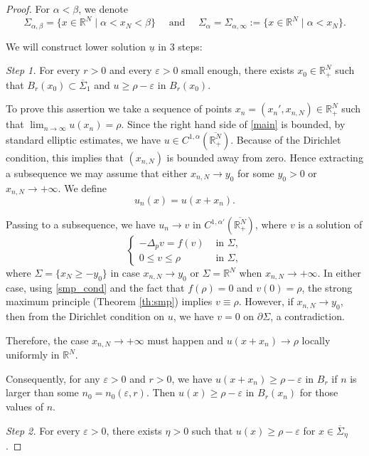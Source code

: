 \documentclass[10pt,a4paper]{amsart}
\begin{document}
	\begin{proof}
		For $\alpha<\beta$, we denote
		\[
		\Sigma_{\alpha,\beta} = \{x\in\mathbb{R}^N \mid \alpha < x_N < \beta\} \quad\text{ and }\quad \Sigma_\alpha = \Sigma_{\alpha,\infty} := \{x\in\mathbb{R}^N \mid \alpha < x_N \}.
		\]
		
		We will construct lower solution $\underline u$ in 3 steps:
		
		\textit{Step 1.} For every $r > 0$ and every $\varepsilon > 0$ small enough, there exists $x_0 \in \mathbb{R}^N_+$
		such that $B_r(x_0) \subset \overline\Sigma_1$ and $u \ge \rho - \varepsilon$ in $B_r(x_0)$.
		
		To prove this assertion we take a sequence of points $x_n=(x_n', x_{n,N}) \in \mathbb{R}^N_+$ such that $\lim_{n\to\infty} u(x_n) = \rho$. Since the right hand side of \eqref{main} is bounded, by standard elliptic estimates, we have $u\in C^{1,\alpha}(\overline{\mathbb{R}^N_+})$. Because of the Dirichlet condition, this implies that $(x_{n,N})$ is bounded away from zero. Hence extracting a subsequence we may assume that either $x_{n,N}\to y_0$ for some $y_0>0$ or $x_{n,N}\to+\infty$. We define
		\[
		u_n(x) = u(x+x_n).
		\]
		
		Passing to a subsequence, we have $u_n\to v$ in $C^{1,\alpha'}(\overline{\mathbb{R}^N_+})$, where $v$ is a solution of
		\[
		\begin{cases}
			-\Delta_p v = f(v) & \text{ in } \Sigma,\\
			0 \le v \le \rho & \text{ in } \Sigma,
		\end{cases}
		\]
		where $\Sigma=\{x_N \ge -y_0\}$ in case $x_{n,N}\to y_0$ or $\Sigma=\mathbb{R}^N$ when $x_{n,N}\to+\infty$. In either case, using \eqref{smp_cond} and the fact that $f (\rho) = 0$ and $v(0)=\rho$, the strong maximum principle (Theorem \ref{th:smp}) implies $v\equiv\rho$. However, if $x_{n,N}\to y_0$, then from the Dirichlet condition on $u$, we have $v=0$ on $\partial \Sigma$, a contradiction.
		
		Therefore, the case $x_{n,N}\to+\infty$ must happen and $u(x+x_n) \to \rho$ locally uniformly in $\mathbb{R}^N$.
		
		Consequently, for any $\varepsilon > 0$ and $r > 0$, we have $u(x + x_n) \ge \rho - \varepsilon$ in $B_r$ if $n$ is larger than some $n_0 = n_0(\varepsilon, r)$. Then $u(x) \ge \rho - \varepsilon$ in $B_r(x_n)$ for those values of $n$.
		
		\textit{Step 2.} For every $\varepsilon > 0$, there exists $\eta > 0$ such that $u(x) \ge \rho - \varepsilon$ for $x\in\overline\Sigma_\eta$.
		

\end{proof}
\end{document}
